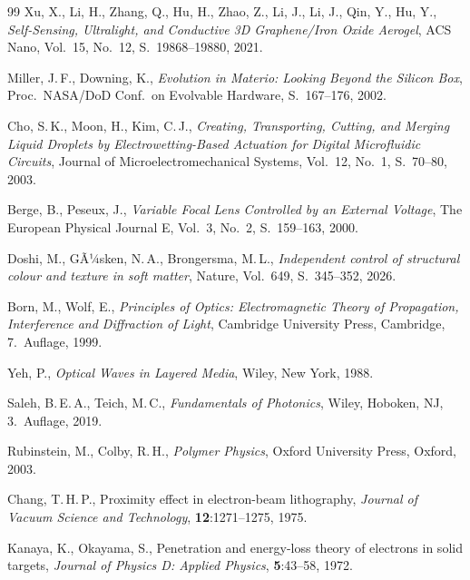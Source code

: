 ﻿\documentclass[a4paper,12pt]{scrreprt}
\theoremstyle{definition}
\begin{document}
\begin{thebibliography}{99}
  Xu, X., Li, H., Zhang, Q., Hu, H., Zhao, Z., Li, J., Li, J., Qin, Y., Hu, Y.,
  \textit{Self-Sensing, Ultralight, and Conductive 3D Graphene/Iron Oxide Aerogel},
  ACS Nano, Vol.~15, No.~12, S.~19868--19880, 2021.

  Miller, J.\,F., Downing, K.,
  \textit{Evolution in Materio: Looking Beyond the Silicon Box},
  Proc.\ NASA/DoD Conf.\ on Evolvable Hardware, S.~167--176, 2002.

  Cho, S.\,K., Moon, H., Kim, C.\,J.,
  \textit{Creating, Transporting, Cutting, and Merging Liquid Droplets by
  Electrowetting-Based Actuation for Digital Microfluidic Circuits},
  Journal of Microelectromechanical Systems, Vol.~12, No.~1, S.~70--80, 2003.

  Berge, B., Peseux, J.,
  \textit{Variable Focal Lens Controlled by an External Voltage},
  The European Physical Journal E, Vol.~3, No.~2, S.~159--163, 2000.

  Doshi, M., GÃ¼sken, N.\,A., Brongersma, M.\,L.,
  \textit{Independent control of structural colour and texture in soft matter},
  Nature, Vol.~649, S.~345--352, 2026.

  Born, M., Wolf, E.,
  \textit{Principles of Optics: Electromagnetic Theory of Propagation,
  Interference and Diffraction of Light},
  Cambridge University Press, Cambridge, 7.~Auflage, 1999.

  Yeh, P.,
  \textit{Optical Waves in Layered Media},
  Wiley, New York, 1988.

  Saleh, B.\,E.\,A., Teich, M.\,C.,
  \textit{Fundamentals of Photonics},
  Wiley, Hoboken, NJ, 3.~Auflage, 2019.

  Rubinstein, M., Colby, R.\,H.,
  \textit{Polymer Physics},
  Oxford University Press, Oxford, 2003.

  Chang, T.\,H.\,P.,
  Proximity effect in electron-beam lithography,
  \textit{Journal of Vacuum Science and Technology},
  \textbf{12}:1271--1275, 1975.

  Kanaya, K., Okayama, S.,
  Penetration and energy-loss theory of electrons in solid targets,
  \textit{Journal of Physics D: Applied Physics}, \textbf{5}:43--58, 1972.


\end{thebibliography}
\end{document}
